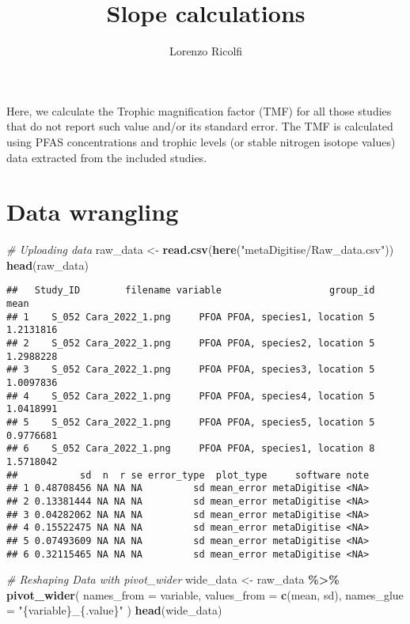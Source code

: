 \documentclass[
]{article}
\title{Slope calculations}
\author{Lorenzo Ricolfi}
\date{}
\newenvironment{Shaded}{\begin{snugshade}}{\end{snugshade}}
\newcommand{\AttributeTok}[1]{\textcolor[rgb]{0.13,0.29,0.53}{#1}}
\newcommand{\CommentTok}[1]{\textcolor[rgb]{0.56,0.35,0.01}{\textit{#1}}}
\newcommand{\FunctionTok}[1]{\textcolor[rgb]{0.13,0.29,0.53}{\textbf{#1}}}
\newcommand{\NormalTok}[1]{#1}
\newcommand{\OtherTok}[1]{\textcolor[rgb]{0.56,0.35,0.01}{#1}}
\newcommand{\SpecialCharTok}[1]{\textcolor[rgb]{0.81,0.36,0.00}{\textbf{#1}}}
\newcommand{\StringTok}[1]{\textcolor[rgb]{0.31,0.60,0.02}{#1}}
\begin{document}
\maketitle

{
\setcounter{tocdepth}{2}
\tableofcontents
}
Here, we calculate the Trophic magnification factor (TMF) for all those
studies that do not report such value and/or its standard error. The TMF
is calculated using PFAS concentrations and trophic levels (or stable
nitrogen isotope values) data extracted from the included studies.

\section{Data wrangling}\label{data-wrangling}

\begin{Shaded}
\begin{Highlighting}[]
\CommentTok{\# Uploading data}
\NormalTok{raw\_data }\OtherTok{\textless{}{-}} \FunctionTok{read.csv}\NormalTok{(}\FunctionTok{here}\NormalTok{(}\StringTok{"metaDigitise/Raw\_data.csv"}\NormalTok{))}
\FunctionTok{head}\NormalTok{(raw\_data)}
\end{Highlighting}
\end{Shaded}

\begin{verbatim}
##   Study_ID        filename variable                   group_id      mean
## 1    S_052 Cara_2022_1.png     PFOA PFOA, species1, location 5 1.2131816
## 2    S_052 Cara_2022_1.png     PFOA PFOA, species2, location 5 1.2988228
## 3    S_052 Cara_2022_1.png     PFOA PFOA, species3, location 5 1.0097836
## 4    S_052 Cara_2022_1.png     PFOA PFOA, species4, location 5 1.0418991
## 5    S_052 Cara_2022_1.png     PFOA PFOA, species5, location 5 0.9776681
## 6    S_052 Cara_2022_1.png     PFOA PFOA, species1, location 8 1.5718042
##           sd  n  r se error_type  plot_type     software note
## 1 0.48708456 NA NA NA         sd mean_error metaDigitise <NA>
## 2 0.13381444 NA NA NA         sd mean_error metaDigitise <NA>
## 3 0.04282062 NA NA NA         sd mean_error metaDigitise <NA>
## 4 0.15522475 NA NA NA         sd mean_error metaDigitise <NA>
## 5 0.07493609 NA NA NA         sd mean_error metaDigitise <NA>
## 6 0.32115465 NA NA NA         sd mean_error metaDigitise <NA>
\end{verbatim}

\begin{Shaded}
\begin{Highlighting}[]
\CommentTok{\# Reshaping Data with pivot\_wider}
\NormalTok{wide\_data }\OtherTok{\textless{}{-}}\NormalTok{ raw\_data }\SpecialCharTok{\%\textgreater{}\%}
  \FunctionTok{pivot\_wider}\NormalTok{(}
    \AttributeTok{names\_from =}\NormalTok{ variable,}
    \AttributeTok{values\_from =} \FunctionTok{c}\NormalTok{(mean, sd),}
    \AttributeTok{names\_glue =} \StringTok{"\{variable\}\_\{.value\}"}
\NormalTok{  )}
\FunctionTok{head}\NormalTok{(wide\_data)}
\end{Highlighting}
\end{Shaded}
\end{document}
